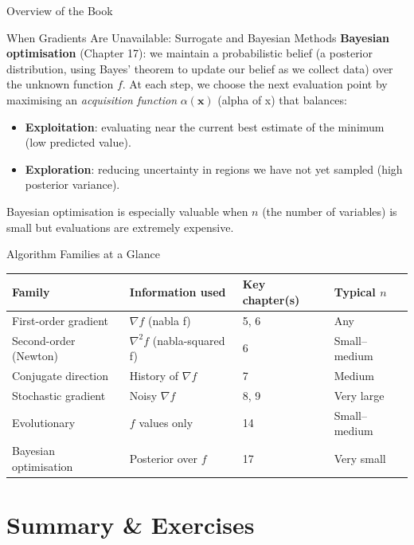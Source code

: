 \documentclass[aspectratio=169,10pt]{beamer}
\newcommand{\vx}{\mathbf{x}}
\newcommand{\grad}{\nabla}
\newcommand{\hess}{\nabla^2}
\begin{document}
\begin{frame}[allowframebreaks]{Overview of the Book}
\begin{block}{When Gradients Are Unavailable: Surrogate and Bayesian Methods}
    \medskip
    \textbf{Bayesian optimisation} (Chapter 17): we maintain a probabilistic
    belief (a posterior distribution, using Bayes' theorem to update our belief
    as we collect data) over the unknown function $f$.  At each step, we choose
    the next evaluation point by maximising an \emph{acquisition function}
    $\alpha(\vx)$ (alpha of x) that balances:
    \begin{itemize}
      \item \textbf{Exploitation}: evaluating near the current best estimate
        of the minimum (low predicted value).
      \item \textbf{Exploration}: reducing uncertainty in regions we have not
        yet sampled (high posterior variance).
    \end{itemize}
    Bayesian optimisation is especially valuable when $n$ (the number of
    variables) is small but evaluations are extremely expensive.
  \end{block}

  \begin{exampleblock}{Algorithm Families at a Glance}
    \centering
    \begin{tabular}{llll}
      \toprule
      \textbf{Family} & \textbf{Information used} & \textbf{Key chapter(s)} & \textbf{Typical $n$} \\
      \midrule
      First-order gradient   & $\grad f$ (nabla f)           & 5, 6         & Any \\
      Second-order (Newton)  & $\hess f$ (nabla-squared f)   & 6            & Small--medium \\
      Conjugate direction    & History of $\grad f$          & 7            & Medium \\
      Stochastic gradient    & Noisy $\grad f$               & 8, 9         & Very large \\
      Evolutionary           & $f$ values only               & 14           & Small--medium \\
      Bayesian optimisation  & Posterior over $f$            & 17           & Very small \\
      \bottomrule
    \end{tabular}
  \end{exampleblock}

\end{frame}

\section{Summary \& Exercises}
\end{document}
